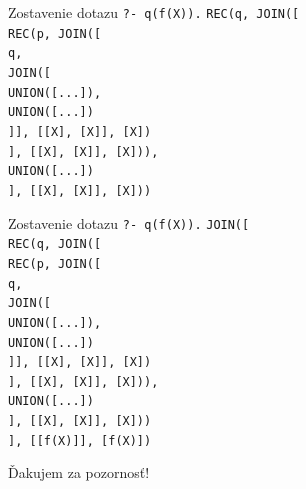 \documentclass[11pt,aspectratio=169]{beamer}
\begin{document}
\begin{frame}{Zostavenie dotazu \texttt{?- q(f(X)).}}
    \texttt{REC(q, JOIN([\\
        \hspace{1em} REC(p, JOIN([\\
        \hspace{2em} q,\\
        \hspace{2em} JOIN([\\
        \hspace{3em} UNION([...]),\\
        \hspace{3em} UNION([...])\\
        \hspace{2em} ]], [[X], [X]], [X])\\
        \hspace{1em} ], [[X], [X]], [X])),\\
        \hspace{1em} UNION([...])\\
        ], [[X], [X]], [X]))
    }
\end{frame}

\begin{frame}{Zostavenie dotazu \texttt{?- q(f(X)).}}
    \texttt{JOIN([\\
        \hspace{1em} REC(q, JOIN([\\
        \hspace{2em} REC(p, JOIN([\\
        \hspace{3em} q,\\
        \hspace{3em} JOIN([\\
        \hspace{4em} UNION([...]),\\
        \hspace{4em} UNION([...])\\
        \hspace{3em} ]], [[X], [X]], [X])\\
        \hspace{2em} ], [[X], [X]], [X])),\\
        \hspace{2em} UNION([...])\\
        \hspace{1em} ], [[X], [X]], [X]))\\
        ], [[f(X)]], [f(X)])
    }
\end{frame}

\begin{frame}{}
    \begin{center}
        Ďakujem za pozornosť!
    \end{center}
\end{frame}
\end{document}
